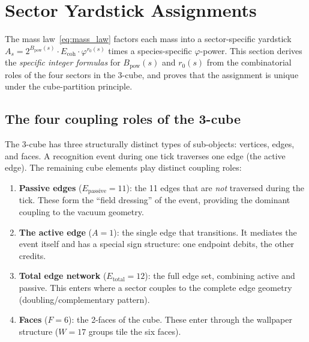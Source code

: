 \documentclass[11pt,a4paper]{article}
\theoremstyle{definition}
\theoremstyle{remark}
\newcommand{\phig}{\varphi}
\newcommand{\Ecoh}{E_{\mathrm{coh}}}
\newcommand{\Epass}{E_{\mathrm{passive}}}
\newcommand{\Etot}{E_{\mathrm{total}}}
\begin{document}

\section{Sector Yardstick Assignments}
\label{sec:yardsticks}

The mass law~\eqref{eq:mass_law} factors each mass into a sector-specific
yardstick $A_s = 2^{B_{\mathrm{pow}}(s)} \cdot \Ecoh \cdot \phig^{r_0(s)}$
times a species-specific $\phig$-power.  This section derives the
\emph{specific integer formulas} for $B_{\mathrm{pow}}(s)$ and $r_0(s)$
from the combinatorial roles of the four sectors in the 3-cube, and
proves that the assignment is unique under the cube-partition principle.

\subsection{The four coupling roles of the 3-cube}

The 3-cube has three structurally distinct types of sub-objects: vertices,
edges, and faces.  A recognition event during one tick traverses one edge (the
active edge).  The remaining cube elements play distinct coupling roles:

\begin{enumerate}[nosep,label=(\alph*)]
  \item \textbf{Passive edges} ($\Epass = 11$): the 11 edges that are \emph{not}
        traversed during the tick.  These form the ``field dressing'' of the
        event, providing the dominant coupling to the vacuum geometry.
  \item \textbf{The active edge} ($A = 1$): the single edge that transitions.
        It mediates the event itself and has a special sign structure: one
        endpoint debits, the other credits.
  \item \textbf{Total edge network} ($\Etot = 12$): the full edge set,
        combining active and passive.  This enters where a sector couples to
        the complete edge geometry (doubling/complementary pattern).
  \item \textbf{Faces} ($F = 6$): the 2-faces of the cube.  These enter
        through the wallpaper structure ($W = 17$ groups tile the six faces).
\end{enumerate}
\end{document}
